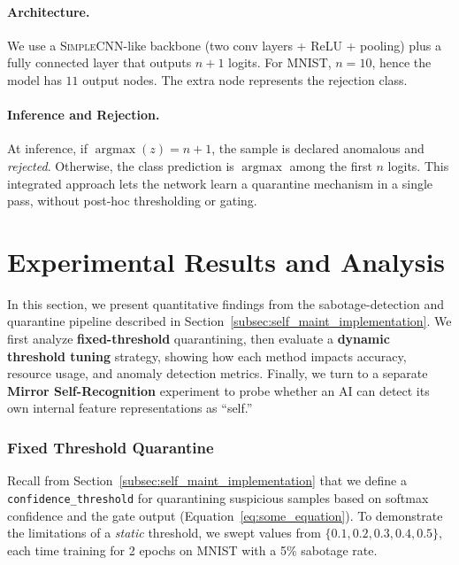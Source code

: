 \documentclass[12pt]{article}
\begin{document}
\paragraph{Architecture.}
We use a \textsc{SimpleCNN}-like backbone (two conv layers + ReLU + pooling)
plus a fully connected layer that outputs $n+1$ logits. For MNIST, $n=10$,
hence the model has $11$ output nodes. The extra node represents the rejection class.

\paragraph{Inference and Rejection.}
At inference, if $\operatorname{argmax}(z) = n+1$, the sample is declared
anomalous and \emph{rejected}. Otherwise, the class prediction is 
$\operatorname{argmax}$ among the first $n$ logits. This integrated approach
lets the network learn a quarantine mechanism in a single pass, without 
post-hoc thresholding or gating.



\section{Experimental Results and Analysis}
\label{sec:experiment_results}

In this section, we present quantitative findings from the sabotage-detection and
quarantine pipeline described in Section~\ref{subsec:self_maint_implementation}.
We first analyze \textbf{fixed-threshold} quarantining, then evaluate a
\textbf{dynamic threshold tuning} strategy, showing how each method impacts
accuracy, resource usage, and anomaly detection metrics. Finally, we turn
to a separate \textbf{Mirror Self-Recognition} experiment to probe whether an AI
can detect its own internal feature representations as “self.”

\subsubsection{Fixed Threshold Quarantine}
\label{subsubsec:fixed_threshold}

Recall from Section~\ref{subsec:self_maint_implementation} that we define a
\texttt{confidence\_threshold} for quarantining suspicious samples based on
softmax confidence and the gate output (Equation~\ref{eq:some_equation}). To
demonstrate the limitations of a \emph{static} threshold, we swept values from
$\{0.1, 0.2, 0.3, 0.4, 0.5\}$, each time training for 2 epochs on MNIST with
a 5\% sabotage rate.
\end{document}

